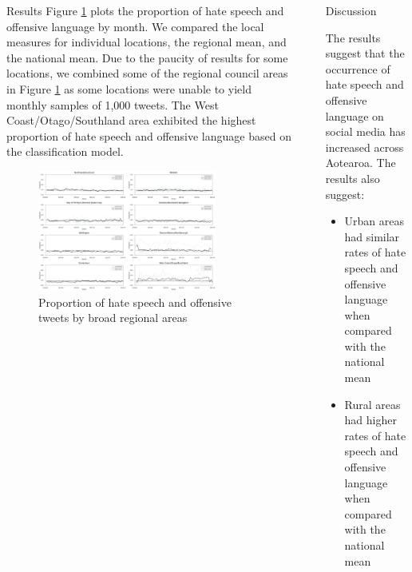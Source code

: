 \documentclass[final]{beamer}
\newlength{\sepwidth}
\newlength{\largecolwidth}
\newlength{\smallcolwidth}
\newcommand{\separatorcolumn}{\begin{column}{\sepwidth}\end{column}}
\begin{document}
\begin{frame}[t]
\begin{columns}[t]
\begin{column}{\largecolwidth}
\begin{block}{Results}
  Figure \ref{fig:3} plots the proportion of hate speech and offensive language by month. We compared the local measures for individual locations, the regional mean, and the national mean. Due to the paucity of results for some locations, we combined some of the regional council areas in Figure \ref{fig:3} as some locations were unable to yield monthly samples of 1,000 tweets. The West Coast/Otago/Southland area exhibited the highest proportion of hate speech and offensive language based on the classification model.
 
    \begin{figure}
        \includegraphics[width=0.8\textwidth]{poster/figures/figure_proportions.png}
        \caption{Proportion of hate speech and offensive tweets by broad regional areas}
        \label{fig:3}
    \end{figure}

  \end{block}

\end{column}

\separatorcolumn

\begin{column}{\smallcolwidth}

  \begin{block}{Discussion}

  The results suggest that the occurrence of hate speech and offensive language on social media has increased across Aotearoa. The results also suggest:
  
  \begin{itemize}
      \item Urban areas had similar rates of hate speech and offensive language when compared with the national mean
      \item Rural areas had higher rates of hate speech and offensive language when compared with the national mean
  \end{itemize}


\end{block}
\end{column}
\end{columns}
\end{frame}
\end{document}
